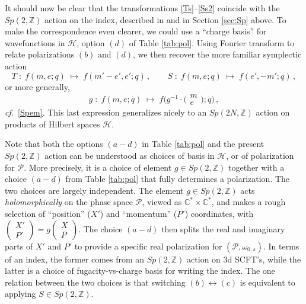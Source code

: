 \documentclass[11pt,letterpaper]{article}
\numberwithin{equation}{section}
\newcommand{\be}{\begin{equation}}
\newcommand{\ee}{\end{equation}}
\newcommand{\cf}{\emph{cf.}}
\newcommand{\Z}{{\mathbb Z}}
\newcommand{\C}{{\mathbb C}}
\newcommand{\CH}{\mathcal{H}}
\newcommand{\CP}{\mathcal{P}}
\begin{document}
It should now be clear that the transformations \eqref{Ts}--\eqref{Ss2} coincide with the $Sp(2,\Z)$ action on the index, described in \cite{KW-index} and in Section \ref{sec:Sp} above. To make the correspondence even clearer, we could use a ``charge basis'' for wavefunctions in $\CH$, option $(d)$ of Table \ref{tab:pol}. Using Fourier transform to relate polarizations $(b)$ and $(d)$, we then recover the more familiar symplectic action
%
\be T\;:\; f(m,e;q)\;\mapsto\; f(m'-e',e';q)\,, \qquad S\;:\; f(m,e;q)\;\mapsto\; f(e',-m';q)\,,\ee
%
or more generally,
%
\be g\;:\; f(m,e;q)\;\mapsto\; f\big( g^{-1}\!\cdot\! \big(\begin{smallmatrix} m\\e\end{smallmatrix}\big);q)\,,\ee
%
\cf\ \eqref{Spem}.
This last expression generalizes nicely to an $Sp(2N,\Z)$ action on products of Hilbert spaces $\CH$.


Note that both the options $(a\!-\!d)$ in Table \ref{tab:pol} and the present $Sp(2,\Z)$ action can be understood as choices of basis in $\CH$, or of polarization for $\CP$. More precisely, it is a choice of element $g\in Sp(2,\Z)$ together with a choice $(a\!-\!d)$ from Table \ref{tab:pol} that fully determines a polarization. The two choices are largely independent. The element $g\in Sp(2,\Z)$ acts \emph{holomorphically} on the phase space $\CP$, viewed as $\C^*\times \C^*$, and makes a rough selection of ``position'' ($X'$) and ``momentum'' ($P'$) coordinates, with $\left(\begin{smallmatrix} X'\\ P'\end{smallmatrix}\right) = g\left(\begin{smallmatrix} X\\ P\end{smallmatrix}\right)$. The choice $(a\!-\!d)$ then splits the real and imaginary parts of $X'$ and $P'$ to provide a specific real polarization for $(\CP,\omega_{0,s})$. In terms of an index, the former comes from an $Sp(2,\Z)$ action on 3d SCFT's, while the latter is a choice of fugacity-vs-charge basis for writing the index. The one relation between the two choices is that switching $(b)\leftrightarrow(c)$ is equivalent to applying $S\in Sp(2,\Z)$.
\end{document}
